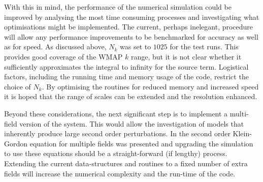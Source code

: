 With this in mind, the performance of the numerical simulation could be improved by
analysing the most time consuming processes and investigating what
optimisations might be implemented. The current, perhaps
inelegant, procedure will allow any performance improvements to be benchmarked for
accuracy as well as for speed.
% 
As discussed above, $N_k$ was set to $1025$ for the test runs. This provides good
coverage of the
WMAP $k$ range, but it is not clear whether it sufficiently
approximates the integral to infinity for the source term.  Logistical factors,
including the running time and memory usage of the code,
restrict the choice of $N_k$. By optimising the routines
for reduced memory and increased speed it is hoped that the range of scales can be
extended and the resolution enhanced.


Beyond these considerations, the next significant step is to implement a multi-field
version of the system. This would allow the investigation of models that inherently
produce large second order perturbations. In  the
second order Klein-Gordon equation for multiple fields was presented and upgrading
the
simulation to use these equations should be a straight-forward (if lengthy) process.
Extending the current data-structures and routines to a fixed number of extra fields
will increase the numerical complexity and the run-time of the code. 

